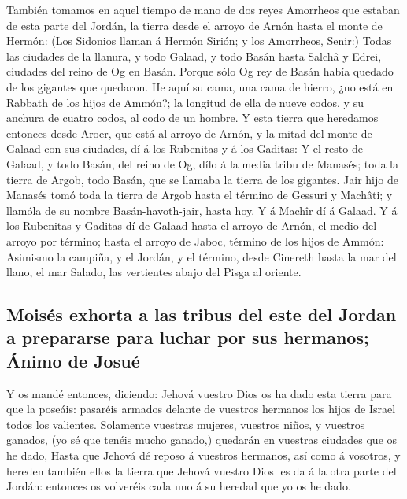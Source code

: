  También tomamos en aquel tiempo de mano de dos reyes
Amorrheos que estaban de esta parte del Jordán, la tierra desde el
arroyo de Arnón hasta el monte de Hermón:  (Los Sidonios
llaman á Hermón Sirión; y los Amorrheos, Senir:)  Todas las
ciudades de la llanura, y todo Galaad, y todo Basán hasta Salchâ y
Edrei, ciudades del reino de Og en Basán.  Porque sólo Og
rey de Basán había quedado de los gigantes que quedaron. He aquí su
cama, una cama de hierro, ¿no está en Rabbath de los hijos de Ammón?; la
longitud de ella de nueve codos, y su anchura de cuatro codos, al codo
de un hombre.  Y esta tierra que heredamos entonces desde
Aroer, que está al arroyo de Arnón, y la mitad del monte de Galaad con
sus ciudades, dí á los Rubenitas y á los Gaditas:  Y el
resto de Galaad, y todo Basán, del reino de Og, dílo á la media tribu de
Manasés; toda la tierra de Argob, todo Basán, que se llamaba la tierra
de los gigantes.  Jair hijo de Manasés tomó toda la tierra
de Argob hasta el término de Gessuri y Machâti; y llamóla de su nombre
Basán-havoth-jair, hasta hoy.  Y á Machîr dí á Galaad.
 Y á los Rubenitas y Gaditas dí de Galaad hasta el arroyo
de Arnón, el medio del arroyo por término; hasta el arroyo de Jaboc,
término de los hijos de Ammón:  Asimismo la campiña, y el
Jordán, y el término, desde Cinereth hasta la mar del llano, el mar
Salado, las vertientes abajo del Pisga al oriente.

\hypertarget{moisuxe9s-exhorta-a-las-tribus-del-este-del-jordan-a-prepararse-para-luchar-por-sus-hermanos-uxe1nimo-de-josuuxe9}{%
\subsection{Moisés exhorta a las tribus del este del Jordan a prepararse
para luchar por sus hermanos; Ánimo de
Josué}\label{moisuxe9s-exhorta-a-las-tribus-del-este-del-jordan-a-prepararse-para-luchar-por-sus-hermanos-uxe1nimo-de-josuuxe9}}

 Y os mandé entonces, diciendo: Jehová vuestro Dios os ha
dado esta tierra para que la poseáis: pasaréis armados delante de
vuestros hermanos los hijos de Israel todos los valientes. 
Solamente vuestras mujeres, vuestros niños, y vuestros ganados, (yo sé
que tenéis mucho ganado,) quedarán en vuestras ciudades que os he dado,
 Hasta que Jehová dé reposo á vuestros hermanos, así como á
vosotros, y hereden también ellos la tierra que Jehová vuestro Dios les
da á la otra parte del Jordán: entonces os volveréis cada uno á su
heredad que yo os he dado.

